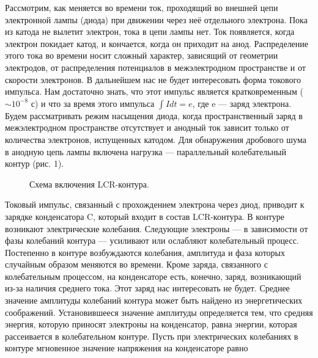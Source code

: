 \documentclass[a4paper, 12pt]{article}%
\begin{document}
	Рассмотрим, как меняется во времени ток, проходящий во внешней
	цепи электронной лампы (диода) при движении через неё отдельного
	электрона. Пока из катода не вылетит электрон, тока в цепи лампы нет.
	Ток появляется, когда электрон покидает катод, и кончается, когда он
	приходит на анод. Распределение этого тока во времени носит сложный
	характер, зависящий от геометрии электродов, от распределения потенциалов в межэлектродном пространстве и от скорости электронов.
	В дальнейшем нас не будет интересовать форма токового импульса. Нам достаточно знать, что этот импульс является кратковременным
	($\sim 10^{-8}$ с) и что за время этого импульса $\int I dt = e$, где e — заряд электрона. Будем рассматривать режим насыщения диода, когда пространственный заряд в межэлектродном пространстве отсутствует и анодный	ток зависит только от количества электронов, испущенных катодом.
	Для обнаружения дробового шума в анодную цепь лампы включена нагрузка — параллельный колебательный контур (рис. 1).
	
	\begin{figure}[H]
		\caption{Схема включения LCR-контура.}
	\end{figure}
	
	Токовый
	импульс, связанный с прохождением электрона через диод, приводит к
	зарядке конденсатора C, который входит в состав LCR-контура. В контуре возникают электрические колебания. Следующие электроны — в
	зависимости от фазы колебаний контура — усиливают или ослабляют колебательный процесс. Постепенно в контуре возбуждаются колебания,
	амплитуда и фаза которых случайным образом меняются во времени.
	Кроме заряда, связанного с колебательным процессом, на конденсаторе
	есть, конечно, заряд, возникающий из-за наличия среднего тока. Этот заряд нас интересовать не будет. Среднее значение амплитуды колебаний
	контура может быть найдено из энергетических соображений. Установившееся значение амплитуды определяется тем, что средняя энергия,
	которую приносят электроны на конденсатор, равна энергии, которая
	рассеивается в колебательном контуре.
	Пусть при электрических колебаниях в контуре мгновенное значение
	напряжения на конденсаторе равно
	
\end{document}
